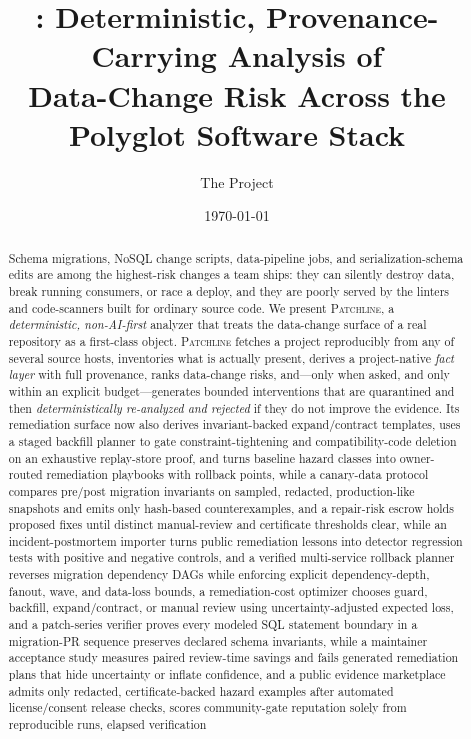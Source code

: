 \documentclass[11pt]{article}
\title{\textbf{\tool: Deterministic, Provenance-Carrying Analysis of\\
Data-Change Risk Across the Polyglot Software Stack}}
\author{The \tool{} Project}
\date{\today}
\newcommand{\tool}{\textsc{Patchline}}
\begin{document}
\maketitle

\begin{abstract}
\noindent
Schema migrations, NoSQL change scripts, data-pipeline jobs, and serialization-schema edits are
among the highest-risk changes a team ships: they can silently destroy data, break running consumers,
or race a deploy, and they are poorly served by the linters and code-scanners built for ordinary
source code. We present \tool, a \emph{deterministic, non-AI-first} analyzer that treats the
data-change surface of a real repository as a first-class object. \tool{} fetches a project
reproducibly from any of several source hosts, inventories what is actually present, derives a
project-native \emph{fact layer} with full provenance, ranks data-change risks, and---only when asked,
and only within an explicit budget---generates bounded interventions that are quarantined and then
\emph{deterministically re-analyzed and rejected} if they do not improve the evidence. Its remediation
surface now also derives invariant-backed expand/contract templates, uses a staged backfill planner to
gate constraint-tightening and compatibility-code deletion on an exhaustive replay-store proof, and
turns baseline hazard classes into owner-routed remediation playbooks with rollback points, while a
canary-data protocol compares pre/post migration invariants on sampled, redacted, production-like
snapshots and emits only hash-based counterexamples, and a repair-risk escrow holds proposed fixes
until distinct manual-review and certificate thresholds clear, while an incident-postmortem importer
turns public remediation lessons into detector regression tests with positive and negative controls, and
a verified multi-service rollback planner reverses migration dependency DAGs while enforcing explicit
dependency-depth, fanout, wave, and data-loss bounds, a remediation-cost optimizer chooses guard,
backfill, expand/contract, or manual review using uncertainty-adjusted expected loss, and a
patch-series verifier proves every modeled SQL statement boundary in a migration-PR sequence preserves
declared schema invariants, while a maintainer acceptance study measures paired review-time savings and
fails generated remediation plans that hide uncertainty or inflate confidence, and a public evidence
marketplace admits only redacted, certificate-backed hazard examples after automated license/consent
release checks, scores community-gate reputation solely from reproducible runs, elapsed verification

\end{abstract}
\end{document}
